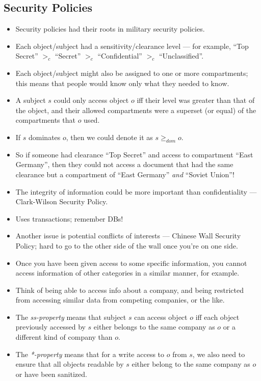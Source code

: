 \documentclass{article}
\begin{document}
\subsection{Security Policies}
\begin{itemize}
    \item Security policies had their roots in military security policies.
    \item Each object/subject had a sensitivity/clearance level --- for example, ``Top Secret'' $>_c$ ``Secret'' $>_c$ ``Confidential'' $>_c$ ``Unclassified''.
    \item Each object/subject might also be assigned to one or more compartments; this means that people would know only what they needed to know.
    \item A subject $s$ could only access object $o$ iff their level was greater than that of the object, and their allowed compartments were a superset (or equal) of the compartments that $o$ used.
    \item If $s$ dominates $o$, then we could denote it as $s \geq_{dom} o$.
    \item So if someone had clearance ``Top Secret'' and access to compartment ``East Germany'', then they could not access a document that had the same clearance but a compartment of ``East Germany'' \emph{and} ``Soviet Union''!
    \item The integrity of information could be more important than confidentiality --- Clark-Wilson Security Policy.
    \item Uses transactions; remember DBs!
    \item Another issue is potential conflicts of interests --- Chinese Wall Security Policy; hard to go to the other side of the wall once you're on one side.
    \item Once you have been given access to some specific information, you cannot access information of other categories in a similar manner, for example.
    \item Think of being able to access info about a company, and being restricted from accessing similar data from competing companies, or the like.
    \item The \emph{ss-property} means that subject $s$ can access object $o$ iff each object previously accessed by $s$ either belongs to the same company as $o$ or a different kind of company than $o$.
    \item The \emph{*-property} means that for a write access to $o$ from $s$, we also need to ensure that all objects readable by $s$ either belong to the same company as $o$ or have been sanitized.

\end{itemize}
\end{document}
